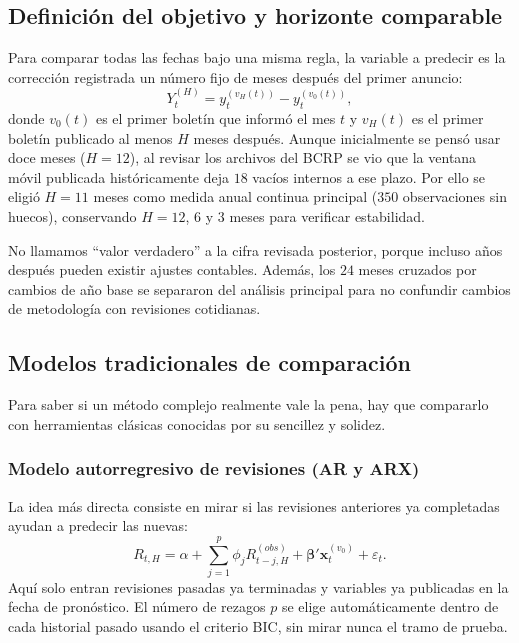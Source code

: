 \subsection{Definición del objetivo y horizonte comparable}

Para comparar todas las fechas bajo una misma regla, la variable a predecir es la corrección registrada un número fijo de meses después del primer anuncio:
\begin{equation}
	Y_t^{(H)}=y_t^{(v_H(t))}-y_t^{(v_0(t))},
	\label{eq:target}
\end{equation}
donde \(v_0(t)\) es el primer boletín que informó el mes \(t\) y \(v_H(t)\) es el primer boletín publicado al menos \(H\) meses después. Aunque inicialmente se pensó usar doce meses (\(H=12\)), al revisar los archivos del BCRP se vio que la ventana móvil publicada históricamente deja \(18\) vacíos internos a ese plazo. Por ello se eligió \(H=11\) meses como medida anual continua principal (\(350\) observaciones sin huecos), conservando \(H=12\), \(6\) y \(3\) meses para verificar estabilidad.

No llamamos ``valor verdadero'' a la cifra revisada posterior, porque incluso años después pueden existir ajustes contables. Además, los \(24\) meses cruzados por cambios de año base se separaron del análisis principal para no confundir cambios de metodología con revisiones cotidianas.

\subsection{Modelos tradicionales de comparación}

Para saber si un método complejo realmente vale la pena, hay que compararlo con herramientas clásicas conocidas por su sencillez y solidez.

\subsubsection{Modelo autorregresivo de revisiones (AR y ARX)}

La idea más directa consiste en mirar si las revisiones anteriores ya completadas ayudan a predecir las nuevas:
\begin{equation}
	R_{t,H}=\alpha+\sum_{j=1}^{p}\phi_j R_{t-j,H}^{(obs)}+\boldsymbol{\beta}'\mathbf{x}_{t}^{(v_0)}+\varepsilon_t.
	\label{eq:ar}
\end{equation}
Aquí solo entran revisiones pasadas ya terminadas y variables ya publicadas en la fecha de pronóstico. El número de rezagos \(p\) se elige automáticamente dentro de cada historial pasado usando el criterio BIC, sin mirar nunca el tramo de prueba.

